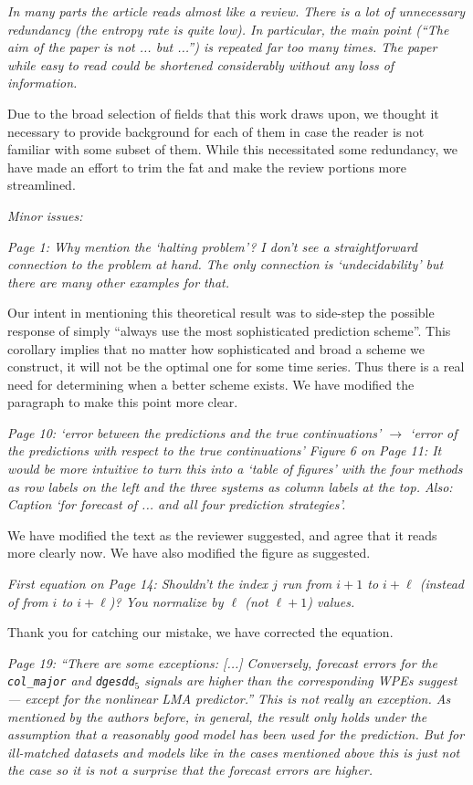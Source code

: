 \documentclass[12pt]{article}
\newcommand{\alert}[1]{{\color{red}#1}}
\begin{document}
\emph{In many parts the article reads almost like a review. There is a lot of
unnecessary redundancy (the entropy rate is quite low). In particular, the main
point (``The aim of the paper is not ... but ...'') is repeated far too many
times. The paper while easy to read could be shortened considerably without any
loss of information.}

Due to the broad selection of fields that this work draws upon, we thought it
necessary to provide background for each of them in case the reader is not
familiar with some subset of them. While this necessitated some redundancy,
\alert{we have made an effort to trim the fat and make the review portions more
streamlined.}

\noindent\emph{Minor issues:}

\emph{Page 1: Why mention the `halting problem'? I don't see a straightforward
connection to the problem at hand. The only connection is `undecidability' but
there are many other examples for that.}

Our intent in mentioning this theoretical result was to side-step the possible
response of simply ``always use the most sophisticated prediction scheme''. This
corollary implies that no matter how sophisticated and broad a scheme we
construct, it will not be the optimal one for some time series. Thus there is a
real need for determining when a better scheme exists. \alert{We have modified
the paragraph to make this point more clear.}

\emph{Page 10: `error between the predictions and the true continuations'
$\rightarrow$ `error of the predictions with respect to the true continuations'
Figure 6 on Page 11: It would be more intuitive to turn this into a `table of
figures' with the four methods as row labels on the left and the three systems
as column labels at the top. Also: Caption `for forecast of ... and all four
prediction strategies'.}

We have modified the text as the reviewer suggested, and agree that it reads
more clearly now. \alert{We have also modified the figure as suggested.}

\emph{First equation on Page 14: Shouldn't the index $j$ run from $i+1$ to
$i+\ell$ (instead of from $i$ to $i+\ell$)? You normalize by $\ell$ (not
$\ell+1$) values.}

Thank you for catching our mistake, we have corrected the equation.

\emph{Page 19: ``There are some exceptions: [...] Conversely, forecast errors
for the \texttt{col\_major} and \texttt{dgesdd$_5$} signals are higher than the
corresponding WPEs suggest --- except for the nonlinear LMA predictor.'' This is
not really an exception. As mentioned by the authors before, in general, the
result only holds under the assumption that a reasonably good model has been
used for the prediction. But for ill-matched datasets and models like in the
cases mentioned above this is just not the case so it is not a surprise that the
forecast errors are higher.}
\end{document}
